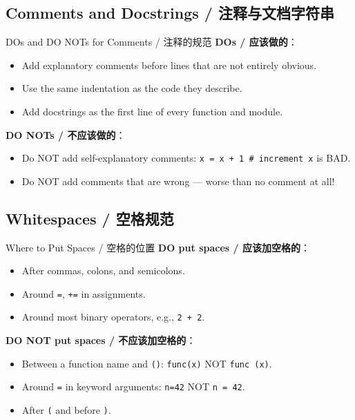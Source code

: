 \documentclass[11pt,a4paper]{article}
\begin{document}
\subsection{Comments and Docstrings / 注释与文档字符串}

\begin{warning}{DOs and DO NOTs for Comments / 注释的规范}
    \textbf{DOs / 应该做的}：
    \begin{itemize}
        \item Add explanatory comments before lines that are not entirely obvious.
        \item Use the same indentation as the code they describe.
        \item Add docstrings as the first line of every function and module.
    \end{itemize}

    \textbf{DO NOTs / 不应该做的}：
    \begin{itemize}
        \item Do NOT add self-explanatory comments: \texttt{x = x + 1  \# increment x} is BAD.
        \item Do NOT add comments that are wrong — worse than no comment at all!
    \end{itemize}
\end{warning}

\subsection{Whitespaces / 空格规范}

\begin{concept}{Where to Put Spaces / 空格的位置}
    \textbf{DO put spaces / 应该加空格的}：
    \begin{itemize}
        \item After commas, colons, and semicolons.
        \item Around \texttt{=}, \texttt{+=} in assignments.
        \item Around most binary operators, e.g., \texttt{2 + 2}.
    \end{itemize}

    \textbf{DO NOT put spaces / 不应该加空格的}：
    \begin{itemize}
        \item Between a function name and \texttt{()}: \texttt{func(x)} NOT \texttt{func (x)}.
        \item Around \texttt{=} in keyword arguments: \texttt{n=42} NOT \texttt{n = 42}.
        \item After \texttt{(} and before \texttt{)}.
    \end{itemize}
\end{concept}
\end{document}
